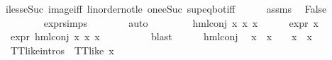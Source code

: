 \begin{isabellebody}
iless{\isacharunderscore}{\kern0pt}eSuc{}\ image{\isacharunderscore}{\kern0pt}iff\ linorder{\isacharunderscore}{\kern0pt}not{\isacharunderscore}{\kern0pt}le\ one{\isacharunderscore}{\kern0pt}eSuc\ sup{\isacharunderscore}{\kern0pt}eq{\isacharunderscore}{\kern0pt}bot{\isacharunderscore}{\kern0pt}iff{\isacharparenright}{\kern0pt}\isanewline
\ \ \ \ \isamarkupfalse%
\ assms\ \isamarkupfalse%
\ False\ \isanewline
\ \ \ \ \ \ \isamarkupfalse%
\ expr{\isacharunderscore}{\kern0pt}{}{\isachardot}{\kern0pt}simps\isanewline
\ \ \ \ \ \ \isamarkupfalse%
\ auto\isanewline
\ \ \isamarkupfalse%
\isanewline
\ \ \ \ \isamarkupfalse%
\ {\isacharparenleft}{\kern0pt}hml{\isacharunderscore}{\kern0pt}conj\ x{}{}\ x{}{}\ x{}{}{\isacharparenright}{\kern0pt}\isanewline
\ \ \ \ \isamarkupfalse%
\ {\isacartoucheopen}expr{\isacharunderscore}{\kern0pt}{}\ x\ {\isasymle}\ {}{\isacartoucheclose}\ \isamarkupfalse%
\ {\isachardoublequoteopen}expr{\isacharunderscore}{\kern0pt}{}\ {\isacharparenleft}{\kern0pt}hml{\isacharunderscore}{\kern0pt}conj\ x{}{}\ x{}{}\ x{}{}{\isacharparenright}{\kern0pt}\ {\isasymle}\ {}{\isachardoublequoteclose}\isanewline
\ \ \ \ \ \ \isamarkupfalse%
\ blast\isanewline
\ \ \ \ \isamarkupfalse%
\ hml{\isacharunderscore}{\kern0pt}conj\ \isamarkupfalse%
\ {\isachardoublequoteopen}{\isacharparenleft}{\kern0pt}{\isasymnot}{\isacharparenleft}{\kern0pt}x{}{}\ {\isacharbackquote}{\kern0pt}\ x{}{}{\isacharparenright}{\kern0pt}\ {\isacharequal}{\kern0pt}\ {\isacharbraceleft}{\kern0pt}{\isacharbraceright}{\kern0pt}\ {\isasymor}\ {\isasymnot}{\isacharparenleft}{\kern0pt}x{}{}\ {\isacharbackquote}{\kern0pt}\ x{}{}{\isacharparenright}{\kern0pt}\ {\isacharequal}{\kern0pt}\ {\isacharbraceleft}{\kern0pt}{\isacharbraceright}{\kern0pt}{\isacharparenright}{\kern0pt}{\isachardoublequoteclose}\isanewline
\ \ \ \ \ \ \isamarkupfalse%
\ TT{\isacharunderscore}{\kern0pt}like{\isachardot}{\kern0pt}intros{\isacharparenleft}{\kern0pt}{}{\isacharparenright}{\kern0pt}\ {\isacartoucheopen}{\isasymnot}\ TT{\isacharunderscore}{\kern0pt}like\ x{\isacartoucheclose}\ \isanewline
\ \ \ \ \ \ \isamarkupfalse%

\end{isabellebody}
